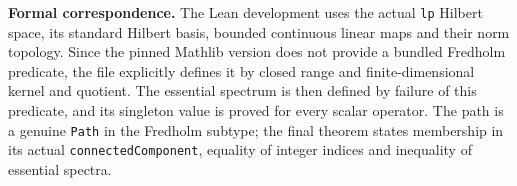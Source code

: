 \documentclass[11pt]{article}
\begin{document}
\textbf{Formal correspondence.} The Lean development uses the actual \texttt{lp} Hilbert space, its standard Hilbert basis, bounded continuous linear maps and their norm topology. Since the pinned Mathlib version does not provide a bundled Fredholm predicate, the file explicitly defines it by closed range and finite-dimensional kernel and quotient. The essential spectrum is then defined by failure of this predicate, and its singleton value is proved for every scalar operator. The path is a genuine \texttt{Path} in the Fredholm subtype; the final theorem states membership in its actual \texttt{connectedComponent}, equality of integer indices and inequality of essential spectra.
\end{document}
